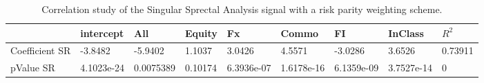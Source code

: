 \begin{table}[H]
\centering
\begin{tabular}{lllllllll}
\hline& intercept & All & Equity & Fx & Commo & FI & InClass & $R^{2}$ \\ 
\hline 
Coefficient SR & -3.8482 & -5.9402 & 1.1037 & 3.0426 & 4.5571 & -3.0286 & 3.6526 & 0.73911 \\ 
pValue SR & 4.1023e-24 & 0.0075389 & 0.10174 & 6.3936e-07 & 1.6178e-16 & 6.1359e-09 & 3.7527e-14 & 0 \\ 
\hline
\end{tabular}
\caption{Correlation study of the Singular Sprectal Analysis signal with a risk parity weighting scheme.}
\label{SSA_RP_CORR}
\end{table}